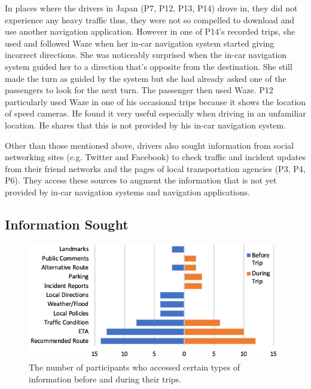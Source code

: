In places where the drivers in Japan (P7, P12, P13, P14) drove in, they did not experience any heavy traffic thus, they were not so compelled to download and use another navigation application. However in one of P14's recorded trips, she used and followed Waze when her in-car navigation system started giving incorrect directions. She was noticeably surprised when the in-car navigation system guided her to a direction that's opposite from the destination. She still made the turn as guided by the system but she had already asked one of the passengers to look for the next turn. The passenger then used Waze. P12 particularly used Waze in one of his occasional trips because it shows the location of speed cameras. He found it very useful especially when driving in an unfamiliar location. He shares that this is not provided by his in-car navigation system. 

Other than those mentioned above, drivers also sought information from social networking sites (e.g. Twitter and Facebook) to check traffic and incident updates from their friend networks and the pages of local transportation agencies (P3, P4, P6). They access these sources to augment the information that is not yet provided by in-car navigation systems and navigation applications. 

\subsection{Information Sought}

\begin{figure}[h]
  \centering
  \vspace{-.20cm}
  \centerline{\includegraphics{figures/s1-info_sought.png}}
  \vspace{-.30cm}
  \caption{The number of participants who accessed certain types of information before and during their trips.}
  \label{fig:s1-info_sought}
\end{figure}


